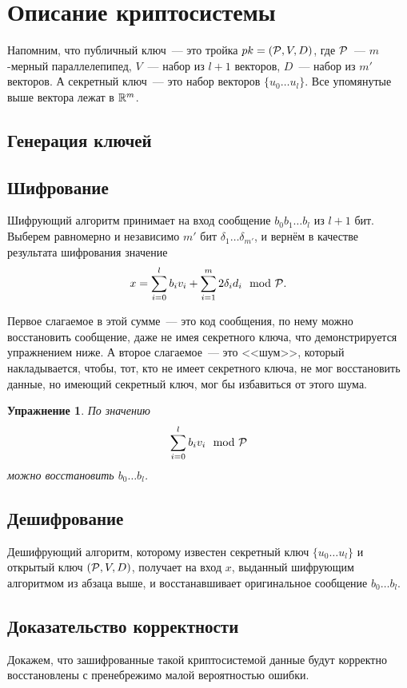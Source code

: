 \documentclass[oneside, a4paper]{article}
\theoremstyle{plain}
\newtheorem{exce}{Упражнение}
\theoremstyle{defn}
\theoremstyle{remark}
\newcommand\PP{\ensuremath \mathcal P}
\newcommand\R{\ensuremath \mathbb R}
\begin{document}
\section{Описание криптосистемы}

Напомним, что публичный ключ~--- это тройка $pk = (\PP, V, D)$, где $\PP$~---
$m$-мерный параллелепипед, $V$~--- набор из $l+1$ векторов, $D$~--- набор из
$m'$ векторов. А секретный ключ~--- это набор векторов $\{u_0 \dots u_l\}$. Все
упомянутые выше вектора лежат в $\R^m$.

\subsection{Генерация ключей}

\subsection{Шифрование} Шифрующий алгоритм принимает на вход сообщение $b_0 b_1 \dots
b_l$ из $l+1$ бит. Выберем равномерно и независимо $m'$ бит $\delta_1 \dots
\delta_{m'}$, и вернём в качестве результата шифрования значение
\[
x = \sum_{i = 0}^l b_i v_i + \sum_{i = 1}^m 2 \delta_i d_i \mod \PP.
\]

Первое слагаемое в этой сумме~--- это код сообщения, по нему можно восстановить
сообщение, даже не имея секретного ключа, что демонстрируется упражнением ниже.
А второе слагаемое~--- это <<шум>>, который накладывается, чтобы, тот, кто не
имеет секретного ключа, не мог восстановить данные, но имеющий секретный ключ,
мог бы избавиться от этого шума.

\begin{exce}
По значению
\[
\sum_{i=0}^l b_i v_i \mod \PP
\]
можно восстановить $b_0 \dots b_l$.
\end{exce}

\subsection{Дешифрование} Дешифрующий алгоритм, которому известен секретный ключ
$\{u_0 \dots u_l\}$ и открытый ключ $(\PP, V, D)$, получает на вход $x$,
выданный шифрующим алгоритмом из абзаца выше, и восстанавшивает оригинальное
сообщение $b_0 \dots b_l$.

\subsection{Доказательство корректности}
Докажем, что зашифрованные такой криптосистемой данные будут корректно
восстановлены с пренебрежимо малой вероятностью ошибки.
\end{document}

